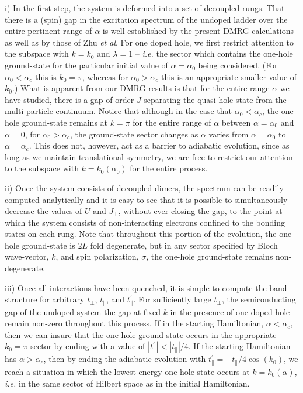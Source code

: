 \documentclass[aps,prb,twocolumn]{revtex4}
\begin{document}
i) In the first step, the system is deformed into a  set of decoupled rungs.  
That there is a (spin) gap in the excitation spectrum of the undoped ladder
over the entire pertinent range of $\alpha$  is well established by the present
DMRG calculations as well as by those of Zhu {\it et al}\cite{Zhu1,Zhu2,Zhu3,Zhu4}.
For one doped hole, we first restrict attention to the
subspace with $k=k_0$ and $\lambda=1$ -- {\it i.e.} the sector which contains
the one-hole ground-state for the particular initial value of $\alpha=\alpha_0$
being considered.  (For $\alpha_0< \alpha_c$ this is $k_0=\pi$, whereas for
$\alpha_0>\alpha_c$ this is an appropriate smaller value of $k_0$.)  What is
apparent from our DMRG results is that for the entire range $\alpha$ we have
studied, there is a gap of order $J$ separating the quasi-hole state from the
multi particle continuum.  Notice that although in the case that $\alpha_0<
\alpha_c$, the one-hole ground-state remains at $k=\pi$ for the entire range of
$\alpha$ between $\alpha=\alpha_0$ and $\alpha=0$, for $\alpha_0 > \alpha_c$,
the ground-state sector changes as $\alpha$ varies from $\alpha=\alpha_0$ to
$\alpha=\alpha_c$.  This does not, however, act as a barrier to adiabatic
evolution, since as long as we maintain translational symmetry, we are free to
restrict our attention to the subspace with $k=k_0(\alpha_0)$ for the entire
process.

ii)  Once the system consists of decoupled dimers, the spectrum can be readily computed 
analytically and it is easy to see that it is possible to simultaneously
decrease the values of $U$ and $J_\perp$, without ever closing the gap, to the
point at which the system consists of non-interacting electrons confined to the
bonding states on each rung.  Note that throughout this portion of the
evolution, the one-hole ground-state is $2L$ fold degenerate, but in any sector
specified by Bloch wave-vector, $k$, and spin polarization, $\sigma$, the
one-hole ground-state remains non-degenerate.

iii)  Once all interactions have been quenched, it is simple to compute the band-structure for arbitrary $t_\perp$, $t_\parallel$, and $t_\parallel^\prime$.  For sufficiently large  $t_\perp$, the semiconducting gap of the undoped system the gap at fixed $k$ in the presence of one doped hole remain non-zero throughout this process.    If in the starting Hamiltonian, $\alpha < \alpha_c$, then we can insure that the one-hole ground-state occurs in the appropriate $k_0=\pi$ sector by ending with a value of $|t_\parallel^\prime| < |t_\parallel|/4$.  If the starting Hamiltonian has $\alpha > \alpha_c$, then by ending the adiabatic evolution with $t_\parallel^\prime=-t_\parallel/4\cos(k_0)$, we reach a situation in which the lowest energy one-hole state occurs at $k=k_0(\alpha)$, {\it i.e.} in the same sector of Hilbert space as in the initial Hamiltonian.
\end{document}
